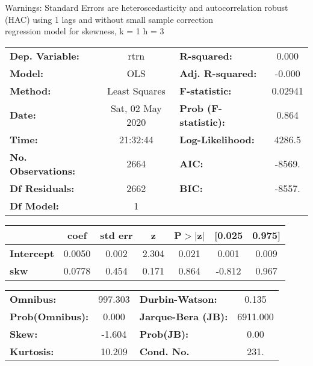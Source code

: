 Warnings: \newline
 [1] Standard Errors are heteroscedasticity and autocorrelation robust (HAC) using 1 lags and without small sample correction\\ 

regression model for skewness, k = 1 h = 3\begin{center}
\begin{tabular}{lclc}
\toprule
\textbf{Dep. Variable:}    &       rtrn       & \textbf{  R-squared:         } &     0.000   \\
\textbf{Model:}            &       OLS        & \textbf{  Adj. R-squared:    } &    -0.000   \\
\textbf{Method:}           &  Least Squares   & \textbf{  F-statistic:       } &   0.02941   \\
\textbf{Date:}             & Sat, 02 May 2020 & \textbf{  Prob (F-statistic):} &    0.864    \\
\textbf{Time:}             &     21:32:44     & \textbf{  Log-Likelihood:    } &    4286.5   \\
\textbf{No. Observations:} &        2664      & \textbf{  AIC:               } &    -8569.   \\
\textbf{Df Residuals:}     &        2662      & \textbf{  BIC:               } &    -8557.   \\
\textbf{Df Model:}         &           1      & \textbf{                     } &             \\
\bottomrule
\end{tabular}
\begin{tabular}{lcccccc}
                   & \textbf{coef} & \textbf{std err} & \textbf{z} & \textbf{P$> |$z$|$} & \textbf{[0.025} & \textbf{0.975]}  \\
\midrule
\textbf{Intercept} &       0.0050  &        0.002     &     2.304  &         0.021        &        0.001    &        0.009     \\
\textbf{skw}       &       0.0778  &        0.454     &     0.171  &         0.864        &       -0.812    &        0.967     \\
\bottomrule
\end{tabular}
\begin{tabular}{lclc}
\textbf{Omnibus:}       & 997.303 & \textbf{  Durbin-Watson:     } &    0.135  \\
\textbf{Prob(Omnibus):} &   0.000 & \textbf{  Jarque-Bera (JB):  } & 6911.000  \\
\textbf{Skew:}          &  -1.604 & \textbf{  Prob(JB):          } &     0.00  \\
\textbf{Kurtosis:}      &  10.209 & \textbf{  Cond. No.          } &     231.  \\
\bottomrule
\end{tabular}
\end{center}

